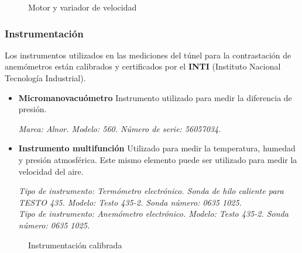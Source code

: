 \begin{figure}[htb]
	\centering
	\label{fig:motorr}
	\hfill
	\label{fig:LS650}
	\caption{Motor y variador de velocidad} 
	
\end{figure}



		
	\subsubsection{Instrumentación}
	Los instrumentos utilizados en las mediciones del túnel para la contrastación de anemómetros  están calibrados y certificados por el \textbf{INTI} (Instituto Nacional Tecnología Industrial).
\begin{itemize}
	\item \textbf{Micromanovacuómetro }
		\subitem Instrumento utilizado para medir la diferencia de presión.
		
		\textit{Marca: Alnor. Modelo: 560. Número de serie: 56057034.} 
	\item \textbf{Instrumento multifunción}
	\subitem  Utilizado para medir la temperatura, humedad y presión atmosférica. Este mismo elemento puede ser utilizado para medir la velocidad del aire.
	
	\textit{Tipo de instrumento: Termómetro electrónico. Sonda de hilo caliente para TESTO 435.  Modelo: Testo 435-2. Sonda
	número: 0635 1025. \\ Tipo de instrumento: Anemómetro electrónico. Modelo: Testo 435-2. Sonda número: 0635 1025.}
	
	
\end{itemize}	   		
		
\begin{figure}[htbp]
	\centering
	\caption{Instrumentación calibrada} \label{fig:instr}
\end{figure}		
		
		
		\newpage